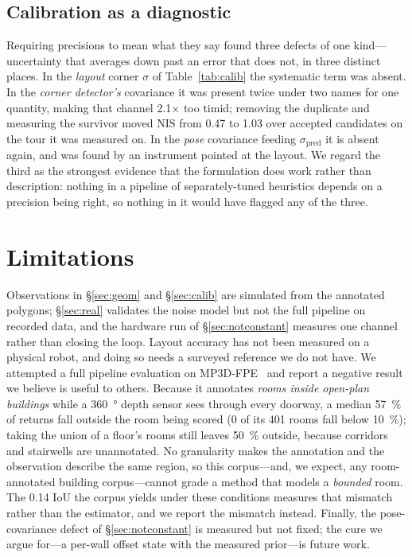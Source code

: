 \documentclass[conference,letterpaper,10pt]{IEEEtran}
\newcommand{\nis}{\ensuremath{\mathrm{NIS}}}
\begin{document}
\subsection{Calibration as a diagnostic}

Requiring precisions to mean what they say found three defects of one kind---uncertainty that
averages down past an error that does not, in three distinct places. In the \emph{layout} corner
$\sigma$ of Table~\ref{tab:calib} the systematic term was absent. In the \emph{corner detector's}
covariance it was present twice under two names for one quantity, making that channel
\num{2.1}$\times$ too timid; removing the duplicate and measuring the survivor moved $\nis$ from
\num{0.47} to \num{1.03} over accepted candidates on the tour it was measured on. In the \emph{pose}
covariance feeding $\sigma_{\text{pred}}$ it is absent again,
and was found by an instrument pointed at the layout. We regard the third as the strongest evidence that the formulation
does work rather than description: nothing in a pipeline of separately-tuned heuristics depends on a
precision being right, so nothing in it would have flagged any of the three.

\section{Limitations}
\label{sec:limits}

Observations in \S\ref{sec:geom} and \S\ref{sec:calib} are simulated from the annotated polygons;
\S\ref{sec:real} validates the noise model but not the full pipeline on recorded data, and the
hardware run of \S\ref{sec:notconstant} measures one channel rather than closing the loop. Layout
accuracy has not been measured on a physical robot, and doing so needs a surveyed reference we do not
have. We attempted a full pipeline evaluation on
MP3D-FPE~\cite{solarte2022dfpe} and report a negative result we believe is useful to others. Because
it annotates \emph{rooms inside open-plan buildings} while a \SI{360}{\degree} depth sensor sees
through every doorway, a median \SI{57}{\percent} of returns fall outside the room being scored
(\num{0} of its \num{401} rooms fall below \SI{10}{\percent}); taking the union of a floor's rooms
still leaves \SI{50}{\percent} outside, because corridors and stairwells are unannotated. No
granularity makes the annotation and the observation describe the same region, so this corpus---and,
we expect, any room-annotated building corpus---cannot grade a method that models a \emph{bounded}
room. The \num{0.14} IoU the corpus yields under these conditions measures that
mismatch rather than the estimator, and we report the mismatch instead.
Finally, the pose-covariance defect of \S\ref{sec:notconstant} is measured but not fixed; the cure we
argue for---a per-wall offset state with the measured prior---is future work.
\end{document}

